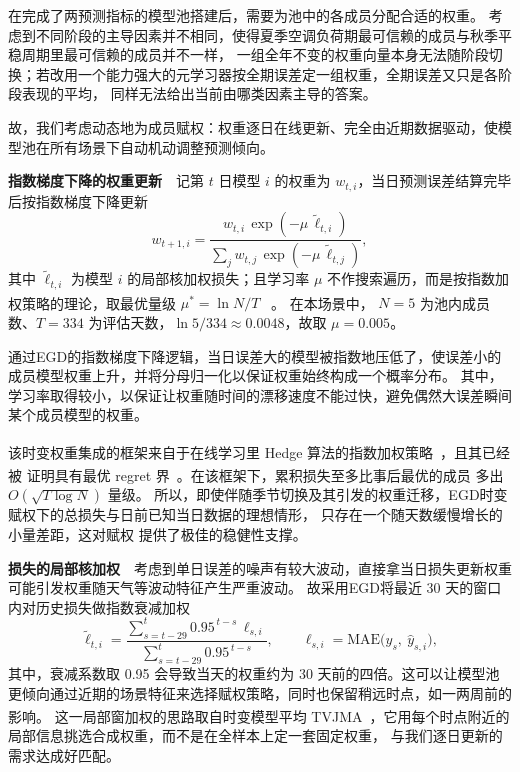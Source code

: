 \documentclass[zihao=-4,a4paper,fontset=none]{ctexart}
\newcommand{\upcite}[1]{\textsuperscript{\cite{#1}}}
\begin{document}
在完成了两预测指标的模型池搭建后，需要为池中的各成员分配合适的权重。
考虑到不同阶段的主导因素并不相同，使得夏季空调负荷期最可信赖的成员与秋季平稳周期里最可信赖的成员并不一样，
一组全年不变的权重向量本身无法随阶段切换；若改用一个能力强大的元学习器按全期误差定一组权重，全期误差又只是各阶段表现的平均，
同样无法给出当前由哪类因素主导的答案。

故，我们考虑动态地为成员赋权：权重逐日在线更新、完全由近期数据驱动，使模型池在所有场景下自动机动调整预测倾向。

\textbf{指数梯度下降的权重更新}\ \ 记第 $t$ 日模型 $i$ 的权重为 $w_{t,i}$，当日预测误差结算完毕后按指数梯度下降更新
\begin{equation}
w_{t+1,i}=\frac{w_{t,i}\,\exp(-\mu\,\tilde\ell_{t,i})}{\sum_j w_{t,j}\,\exp(-\mu\,\tilde\ell_{t,j})},
\label{eq:egd}
\end{equation}
其中 $\tilde\ell_{t,i}$ 为模型 $i$ 的局部核加权损失；且学习率 $\mu$ 不作搜索遍历，而是按指数加权策略的理论，取最优量级 $\mu^{*}=\ln N/T$~\upcite{guohs2026} 。
在本场景中， $N=5$ 为池内成员数、$T=334$ 为评估天数，$\ln 5/334\approx0.0048$，故取 $\mu=0.005$。

通过EGD的指数梯度下降逻辑，当日误差大的模型被指数地压低了，使误差小的成员模型权重上升，并将分母归一化以保证权重始终构成一个概率分布。
其中，学习率取得较小，以保证让权重随时间的漂移速度不能过快，避免偶然大误差瞬间某个成员模型的权重。

该时变权重集成的框架来自于在线学习里 Hedge 算法的指数加权策略~\upcite{zhang2023onenet}，且其已经被
证明具有最优 regret 界~\upcite{mourtada2019}。在该框架下，累积损失至多比事后最优的成员
多出 $O(\sqrt{T\log N})$ 量级。
所以，即使伴随季节切换及其引发的权重迁移，EGD时变赋权下的总损失与日前已知当日数据的理想情形，
只存在一个随天数缓慢增长的小量差距，这对赋权
提供了极佳的稳健性支撑。

\textbf{损失的局部核加权}\ \ 考虑到单日误差的噪声有较大波动，直接拿当日损失更新权重可能引发权重随天气等波动特征产生严重波动。
故采用EGD将最近 30 天的窗口内对历史损失做指数衰减加权
\begin{equation}
\tilde\ell_{t,i}=\frac{\sum_{s=t-29}^{t}0.95^{\,t-s}\,\ell_{s,i}}{\sum_{s=t-29}^{t}0.95^{\,t-s}},
\qquad \ell_{s,i}=\mathrm{MAE}\bigl(y_s,\ \hat y_{s,i}\bigr),
\label{eq:kernel}
\end{equation}
其中，衰减系数取 0.95 会导致当天的权重约为 30 天前的四倍。这可以让模型池更倾向通过近期的场景特征来选择赋权策略，同时也保留稍远时点，如一两周前的影响。
这一局部窗加权的思路取自时变模型平均 TVJMA~\upcite{sun2021tvjma}，它用每个时点附近的局部信息挑选合成权重，而不是在全样本上定一套固定权重，
与我们逐日更新的需求达成好匹配。
\end{document}
